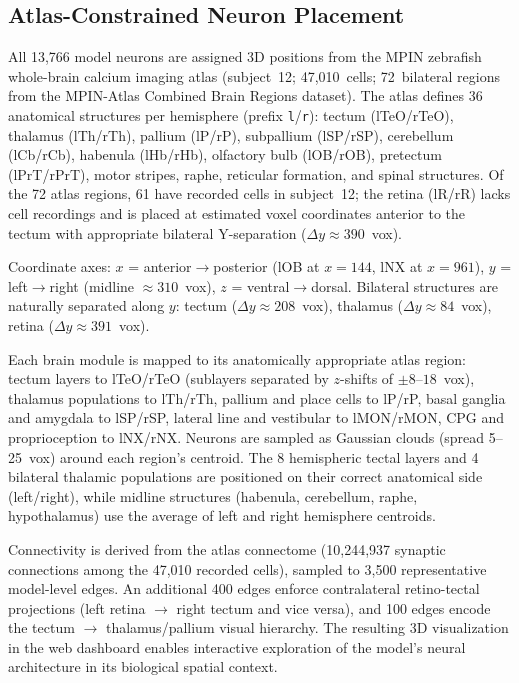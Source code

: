 \documentclass[11pt,a4paper]{article}
\begin{document}
\subsection{Atlas-Constrained Neuron Placement}

All 13,766 model neurons are assigned 3D positions from the MPIN zebrafish whole-brain calcium imaging atlas (subject~12; 47,010~cells; 72~bilateral regions from the MPIN-Atlas Combined Brain Regions dataset). The atlas defines 36 anatomical structures per hemisphere (prefix \texttt{l}/\texttt{r}): tectum (lTeO/rTeO), thalamus (lTh/rTh), pallium (lP/rP), subpallium (lSP/rSP), cerebellum (lCb/rCb), habenula (lHb/rHb), olfactory bulb (lOB/rOB), pretectum (lPrT/rPrT), motor stripes, raphe, reticular formation, and spinal structures. Of the 72 atlas regions, 61 have recorded cells in subject~12; the retina (lR/rR) lacks cell recordings and is placed at estimated voxel coordinates anterior to the tectum with appropriate bilateral Y-separation ($\Delta y \approx 390$~vox).

Coordinate axes: $x$ = anterior$\to$posterior (lOB at $x=144$, lNX at $x=961$), $y$ = left$\to$right (midline $\approx 310$~vox), $z$ = ventral$\to$dorsal. Bilateral structures are naturally separated along $y$: tectum ($\Delta y \approx 208$~vox), thalamus ($\Delta y \approx 84$~vox), retina ($\Delta y \approx 391$~vox).

Each brain module is mapped to its anatomically appropriate atlas region: tectum layers to lTeO/rTeO (sublayers separated by $z$-shifts of $\pm 8$--$18$~vox), thalamus populations to lTh/rTh, pallium and place cells to lP/rP, basal ganglia and amygdala to lSP/rSP, lateral line and vestibular to lMON/rMON, CPG and proprioception to lNX/rNX. Neurons are sampled as Gaussian clouds (spread 5--25~vox) around each region's centroid. The 8 hemispheric tectal layers and 4 bilateral thalamic populations are positioned on their correct anatomical side (left/right), while midline structures (habenula, cerebellum, raphe, hypothalamus) use the average of left and right hemisphere centroids.

Connectivity is derived from the atlas connectome (10,244,937 synaptic connections among the 47,010 recorded cells), sampled to 3,500 representative model-level edges. An additional 400 edges enforce contralateral retino-tectal projections (left retina $\to$ right tectum and vice versa), and 100 edges encode the tectum $\to$ thalamus/pallium visual hierarchy. The resulting 3D visualization in the web dashboard enables interactive exploration of the model's neural architecture in its biological spatial context.
\end{document}
